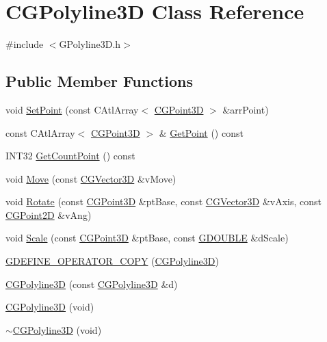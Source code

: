 \hypertarget{class_c_g_polyline3_d}{}\section{C\+G\+Polyline3\+D Class Reference}
\label{class_c_g_polyline3_d}


{\ttfamily \#include $<$G\+Polyline3\+D.\+h$>$}

\subsection*{Public Member Functions}
\begin{DoxyCompactItemize}
\item 
void \hyperlink{class_c_g_polyline3_d_aecee1a61cb73c8f5fa8688ebe6080221}{Set\+Point} (const C\+Atl\+Array$<$ \hyperlink{class_c_g_point3_d}{C\+G\+Point3\+D} $>$ \&arr\+Point)
\item 
const C\+Atl\+Array$<$ \hyperlink{class_c_g_point3_d}{C\+G\+Point3\+D} $>$ \& \hyperlink{class_c_g_polyline3_d_a20ed4bf7de04b1a572c019a58b603848}{Get\+Point} () const 
\item 
I\+N\+T32 \hyperlink{class_c_g_polyline3_d_a05f1b1aa94e7dd25308ac3adc62bf4a3}{Get\+Count\+Point} () const 
\item 
void \hyperlink{class_c_g_polyline3_d_ab2f6102b7308c047778074d02f63f403}{Move} (const \hyperlink{_g_point3_d_8h_aa7e73d39f4c991acb5a13c84b498366d}{C\+G\+Vector3\+D} \&v\+Move)
\item 
void \hyperlink{class_c_g_polyline3_d_a9789aa67f1e64fed1748fa4110066f68}{Rotate} (const \hyperlink{class_c_g_point3_d}{C\+G\+Point3\+D} \&pt\+Base, const \hyperlink{_g_point3_d_8h_aa7e73d39f4c991acb5a13c84b498366d}{C\+G\+Vector3\+D} \&v\+Axis, const \hyperlink{class_c_g_point2_d}{C\+G\+Point2\+D} \&v\+Ang)
\item 
void \hyperlink{class_c_g_polyline3_d_a96b90f1a4a85a635111f7f4bc354daed}{Scale} (const \hyperlink{class_c_g_point3_d}{C\+G\+Point3\+D} \&pt\+Base, const \hyperlink{_g_types_8h_afd05ac85f90ee8e2a733928545462cd4}{G\+D\+O\+U\+B\+L\+E} \&d\+Scale)
\item 
\hyperlink{class_c_g_polyline3_d_a14a1fe19506597897fbe897f2e5c6d55}{G\+D\+E\+F\+I\+N\+E\+\_\+\+O\+P\+E\+R\+A\+T\+O\+R\+\_\+\+C\+O\+P\+Y} (\hyperlink{class_c_g_polyline3_d}{C\+G\+Polyline3\+D})
\item 
\hyperlink{class_c_g_polyline3_d_aac71021e426be30898be39d38df2e4ac}{C\+G\+Polyline3\+D} (const \hyperlink{class_c_g_polyline3_d}{C\+G\+Polyline3\+D} \&d)
\item 
\hyperlink{class_c_g_polyline3_d_a77de35d3ff56b9c0b5af516dbb8e0f02}{C\+G\+Polyline3\+D} (void)
\item 
\hyperlink{class_c_g_polyline3_d_a7c796c6bf8c7234b37bd486ac2cfef64}{$\sim$\+C\+G\+Polyline3\+D} (void)
\end{DoxyCompactItemize}


